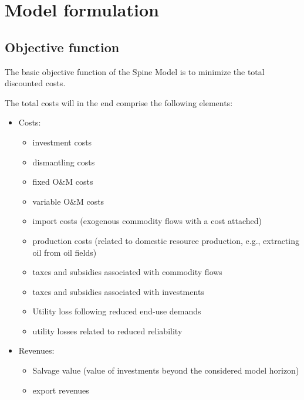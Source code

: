 

\section{Model formulation}

\subsection{Objective function}

The basic objective function of the Spine Model is to minimize the total discounted costs.


The total costs will in the end comprise the following elements:
\begin{itemize}
	\item Costs:
	\begin{itemize}
		\item investment costs
		\item dismantling costs
		\item fixed O\&M costs
		\item variable O\&M costs
		\item import costs (exogenous commodity flows with a cost attached)
		\item production costs (related to domestic resource production, e.g., extracting oil from oil fields)
		\item taxes and subsidies associated with commodity flows
		\item taxes and subsidies associated with investments
		\item Utility loss following reduced end-use demands
		\item utility losses related to reduced reliability
	\end{itemize}
	\item Revenues:
	\begin{itemize}
		\item Salvage value (value of investments beyond the considered model horizon)
		\item export revenues
	\end{itemize}
\end{itemize}





